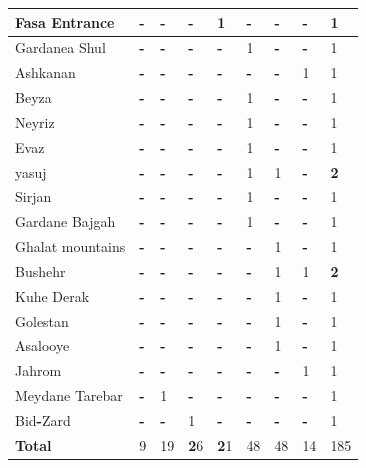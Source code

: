\documentclass[11pt]{article}
\begin{document}
\begin{table}
\begin{tabular}{|l|l|l|l|l|l|l|l|l|}
\hline
Fasa Entrance & \textbf{-} & \textbf{-} & \textbf{-} & 1 & \textbf{-} & \textbf{-} & \textbf{-} & 1 \\
\hline
Gardanea Shul & \textbf{-} & \textbf{-} & \textbf{-} & \textbf{-} & 1 & \textbf{-} & \textbf{-} & 1 \\
\hline
Ashkanan & \textbf{-} & \textbf{-} & \textbf{-} & \textbf{-} & \textbf{-} & \textbf{-} & 1 & 1 \\
\hline
Beyza & \textbf{-} & \textbf{-} & \textbf{-} & \textbf{-} & 1 & \textbf{-} & \textbf{-} & 1 \\
\hline
Neyriz & \textbf{-} & \textbf{-} & \textbf{-} & \textbf{-} & 1 & \textbf{-} & \textbf{-} & 1 \\
\hline
Evaz & \textbf{-} & \textbf{-} & \textbf{-} & \textbf{-} & 1 & \textbf{-} & \textbf{-} & 1 \\
\hline
yasuj & \textbf{-} & \textbf{-} & \textbf{-} & \textbf{-} & 1 & 1 & \textbf{-} & \textbf{\textbf{\textbf{2}}} \\
\hline
Sirjan & \textbf{-} & \textbf{-} & \textbf{-} & \textbf{-} & 1 & \textbf{-} & \textbf{-} & 1 \\
\hline
Gardane Bajgah & \textbf{-} & \textbf{-} & \textbf{-} & \textbf{-} & 1 & \textbf{-} & \textbf{-} & 1 \\
\hline
Ghalat mountains & \textbf{-} & \textbf{-} & \textbf{-} & \textbf{-} & \textbf{-} & 1 & \textbf{-} & 1 \\
\hline
Bushehr & \textbf{-} & \textbf{-} & \textbf{-} & \textbf{-} & \textbf{-} & 1 & 1 & \textbf{\textbf{\textbf{2}}} \\
\hline
Kuhe Derak & \textbf{-} & \textbf{-} & \textbf{-} & \textbf{-} & \textbf{-} & 1 & \textbf{-} & 1 \\
\hline
Golestan & \textbf{-} & \textbf{-} & \textbf{-} & \textbf{-} & \textbf{-} & 1 & \textbf{-} & 1 \\
\hline
Asalooye & \textbf{-} & \textbf{-} & \textbf{-} & \textbf{-} & \textbf{-} & 1 & \textbf{-} & 1 \\
\hline
Jahrom & \textbf{-} & \textbf{-} & \textbf{-} & \textbf{-} & \textbf{-} & \textbf{-} & 1 & 1 \\
\hline
Meydane Tarebar & \textbf{-} & 1 & \textbf{-} & \textbf{-} & \textbf{-} & \textbf{-} & \textbf{-} & 1 \\
\hline
Bid\textbf{-}Zard & \textbf{-} & \textbf{-} & 1 & \textbf{-} & \textbf{-} & \textbf{-} & \textbf{-} & 1 \\
\hline
\textbf{Total} & 9 & 19 & \textbf{\textbf{\textbf{2}}}6 & \textbf{\textbf{\textbf{2}}}1 & 48 & 48 & 14 & 185 \\
\hline
\end{tabular}
\end{table}
\end{document}
